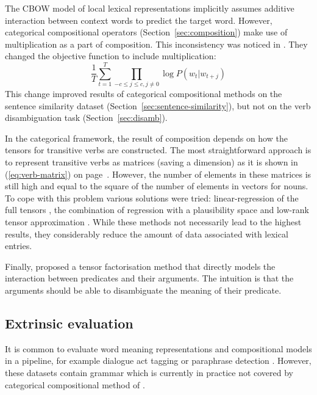 The CBOW model of local lexical representations \cite{mikolov2013linguistic,mikolov2013distributed,mikolov2013efficient} 
implicitly assumes additive interaction between context words to predict the target word. However, categorical compositional operators (Section~\ref{sec:composition}) make use of multiplication as a part of composition. This inconsistency was noticed in \citet{kim2015neural}. They changed the objective function
to include multiplication:
%
\begin{equation}
 \frac{1}{T}\sum^{T}_{t=1}\prod_{-c \leq j \leq c, j\neq0} \log P(w_{t}|w_{t+j})
  \label{eq:objective-func-cbow-mult}
\end{equation}
%
This change improved results of categorical compositional methods on the sentence similarity dataset (Section~\ref{sec:sentence-similarity}), but not on the verb disambiguation task (Section~\ref{sec:disamb}).

In the categorical framework, the result of composition depends on how the tensors for transitive verbs are constructed. The most straightforward approach is to represent transitive verbs as matrices (saving a dimension) as it is shown in (\ref{eq:verb-matrix}) on page~\pageref{eq:verb-matrix}. However, the number of elements in these matrices is still high and equal to the square of the number of elements in vectors for nouns. To cope with this problem various solutions were tried: linear-regression of the full tensors \cite{grefenstette-et-al:2013:IWCS2013}, the combination of regression with a plausibility space \cite{polajnar-clark:2014:EACL} and low-rank tensor approximation \cite{fried-polajnar-clark:2015:ACL-IJCNLP}. While these methods not necessarily lead to the highest results, they considerably reduce the amount of data associated with lexical entries.

Finally, \citet{hashimoto-tsuruoka:2015:CVSC,hashimoto-EtAl:2014:EMNLP2014} proposed a tensor factorisation method that directly models the interaction between predicates and their arguments. The intuition is that the arguments should be able to disambiguate the meaning of their predicate.

\subsection{Extrinsic evaluation}

It is common to evaluate word meaning representations and compositional models in a pipeline, for example dialogue act tagging \cite{Stolcke:2000:DAM:971869.971872} or paraphrase detection \cite{dolan2005par}. However, these datasets contain grammar which is currently in practice not covered by categorical compositional method of \citet{DBLP:journals/corr/abs-1003-4394}.

